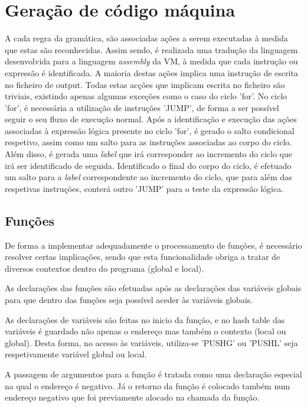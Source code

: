 \documentclass[a4paper,10pt]{report}
\begin{document}
\section{Geração de código máquina}
A cada regra da gramática, são associadas ações a serem executadas à medida que estas são reconhecidas. Assim sendo, é realizada uma tradução da linguagem desenvolvida para a linguagem \emph{assembly} da VM, à medida que cada instrução ou expressão é identificada. A maioria destas ações implica uma instrução de escrita no ficheiro de output. Todas estas acções que implicam escrita no ficheiro são triviais, existindo apenas algumas exceções como o caso do ciclo 'for'.
No ciclo 'for', é necessária a utilização de instruções 'JUMP', de forma a ser possível seguir o seu fluxo de execução normal. Após a identificação e execução das ações associadas à expressão lógica presente no ciclo 'for', é gerado o salto condicional respetivo, assim como um salto para as instruções associadas ao corpo do ciclo. Além disso, é gerada uma \emph{label} que irá corresponder ao incremento do ciclo que irá ser identificado de seguida. Identificado o final do corpo do ciclo, é efetuado um salto para a \emph{label} correspondente ao incremento do ciclo, que para além das respetivas instruções, conterá outro 'JUMP' para o teste da expressão lógica.

\subsection{Funções}

De forma a implementar adequadamente o processamento de funções, é necessário resolver certas implicações, sendo que esta funcionalidade obriga a tratar de diversos contextos dentro do programa (global e local).

As declarações das funções são efetuadas após as declarações das variáveis globais para que dentro das funções seja possível aceder às variáveis globais.

As declarações de variáveis são feitas no inicio da função, e no hash table das variáveis é guardado não apenas o endereço mas também o contexto (local ou global). Desta forma, no acesso às variáveis, utiliza-se 'PUSHG' ou 'PUSHL' seja respetivamente variável global ou local.

A passagem de argumentos para a função é tratada como uma declaração especial na qual o endereço é negativo. Já o retorno da função é colocado também num endereço negativo que foi previamente alocado na chamada da função.
\end{document}
